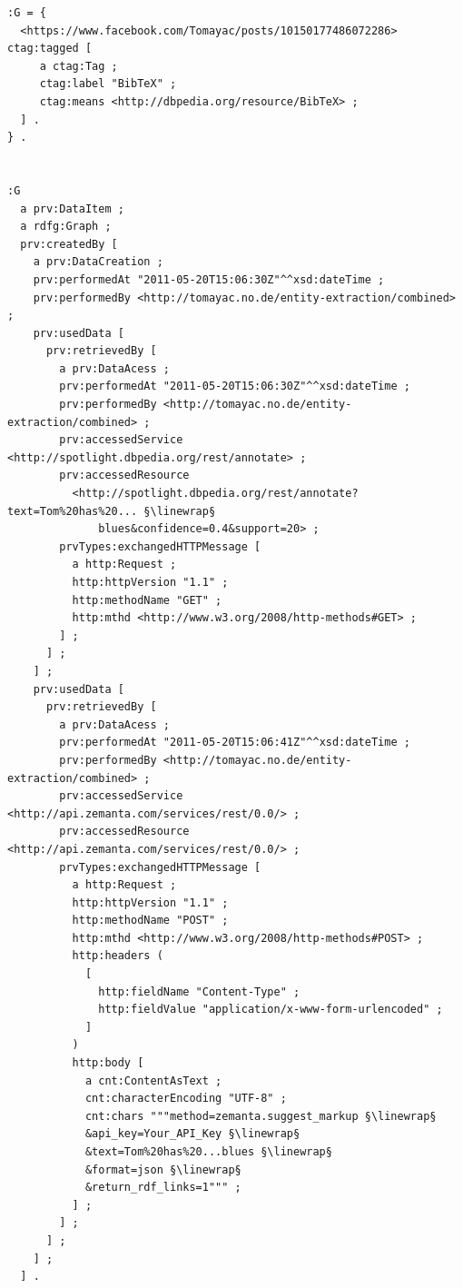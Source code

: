\begin{lstlisting}[caption={[Shortened overview of the provenance
       RDF in Turtle syntax]{Shortened overview of the provenance
       RDF in Turtle syntax for an automatically annotated
       micropost}},
  label={code:provenance},escapechar=§]
:G = {
  <https://www.facebook.com/Tomayac/posts/10150177486072286> ctag:tagged [
     a ctag:Tag ;
     ctag:label "BibTeX" ;
     ctag:means <http://dbpedia.org/resource/BibTeX> ;
  ] .
} .


:G
  a prv:DataItem ;
  a rdfg:Graph ;
  prv:createdBy [
    a prv:DataCreation ;
    prv:performedAt "2011-05-20T15:06:30Z"^^xsd:dateTime ;
    prv:performedBy <http://tomayac.no.de/entity-extraction/combined> ;
    prv:usedData [
      prv:retrievedBy [
        a prv:DataAcess ;
        prv:performedAt "2011-05-20T15:06:30Z"^^xsd:dateTime ;
        prv:performedBy <http://tomayac.no.de/entity-extraction/combined> ;
        prv:accessedService <http://spotlight.dbpedia.org/rest/annotate> ;
        prv:accessedResource
          <http://spotlight.dbpedia.org/rest/annotate?text=Tom%20has%20... §\linewrap§
              blues&confidence=0.4&support=20> ;
        prvTypes:exchangedHTTPMessage [
          a http:Request ;
          http:httpVersion "1.1" ;
          http:methodName "GET" ;
          http:mthd <http://www.w3.org/2008/http-methods#GET> ;
        ] ;
      ] ;
    ] ;
    prv:usedData [
      prv:retrievedBy [
        a prv:DataAcess ;
        prv:performedAt "2011-05-20T15:06:41Z"^^xsd:dateTime ;
        prv:performedBy <http://tomayac.no.de/entity-extraction/combined> ;
        prv:accessedService <http://api.zemanta.com/services/rest/0.0/> ;
        prv:accessedResource <http://api.zemanta.com/services/rest/0.0/> ;
        prvTypes:exchangedHTTPMessage [
          a http:Request ;
          http:httpVersion "1.1" ;
          http:methodName "POST" ;
          http:mthd <http://www.w3.org/2008/http-methods#POST> ;
          http:headers (
            [
              http:fieldName "Content-Type" ;
              http:fieldValue "application/x-www-form-urlencoded" ;
            ]   
          )
          http:body [
            a cnt:ContentAsText ;
            cnt:characterEncoding "UTF-8" ;
            cnt:chars """method=zemanta.suggest_markup §\linewrap§
            &api_key=Your_API_Key §\linewrap§
            &text=Tom%20has%20...blues §\linewrap§
            &format=json §\linewrap§
            &return_rdf_links=1""" ;
          ] ;
        ] ;
      ] ;
    ] ;
  ] .
\end{lstlisting}

